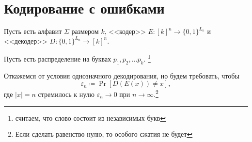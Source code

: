 \section{Кодирование с ошибками}
Пусть есть алфавит $ \Sigma$ размером  $ k$, <<кодер>>  $ E \colon [k]^{n} \to  \{0, 1\}^{L_n}$ и <<декодер>> $ D\colon \{0, 1\}^{L_n} \to [k]^{n}$.

Пусть есть распределение на буквах $  p_1, p_2, \ldots p_k$. \footnote{считаем, что слово состоит из независимых букв}

Откажемся от условия однозначного декодирования, но будем требовать, чтобы 
 $$ \varepsilon _n \coloneqq \Pr [D(E(x)) \ne x],$$ где $\lvert x  \rvert = n$ стремилось к нулю $ \varepsilon _n \to  0$ при $ n \to  \infty$.\footnote{Если сделать равенство нулю, то особого сжатия не будет}


